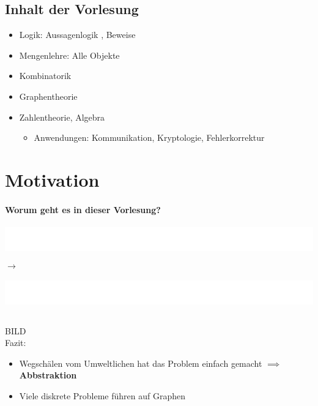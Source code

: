 \section{Inhalt der Vorlesung}
\begin{itemize}
	\item Logik: Aussagenlogik , Beweise
	\item Mengenlehre: Alle Objekte
	\item Kombinatorik
	\item Graphentheorie
	\item Zahlentheorie, Algebra
	\begin{itemize}
		\item Anwendungen: Kommunikation, Kryptologie, Fehlerkorrektur
	\end{itemize}
\end{itemize}

\chapter{Motivation}
\subsubsection{Worum geht es in dieser Vorlesung?}

\begin{bsp}[note = Modellierung]
\colorbox{White}{\parbox{3\skak}{
	\WhiteKnightOnBlack\WhiteEmptySquare\WhiteKnightOnBlack\\
	\WhiteEmptySquare\BlackEmptySquare\WhiteEmptySquare\\
	\BlackKnightOnBlack\WhiteEmptySquare\BlackKnightOnBlack
}} $\longrightarrow$
\colorbox{White}{\parbox{3\skak}{
	\WhiteKnightOnBlack\WhiteEmptySquare\BlackKnightOnBlack\\
	\WhiteEmptySquare\BlackEmptySquare\WhiteEmptySquare\\
	\BlackKnightOnBlack\WhiteEmptySquare\WhiteKnightOnBlack
}}\\
BILD \\
Fazit: \\
\begin{itemize}
	\item Wegschälen vom Umweltlichen hat das Problem einfach gemacht $\implies$ \textbf{Abbstraktion}
	\item Viele diskrete Probleme führen auf Graphen
\end{itemize}
\end{bsp}

